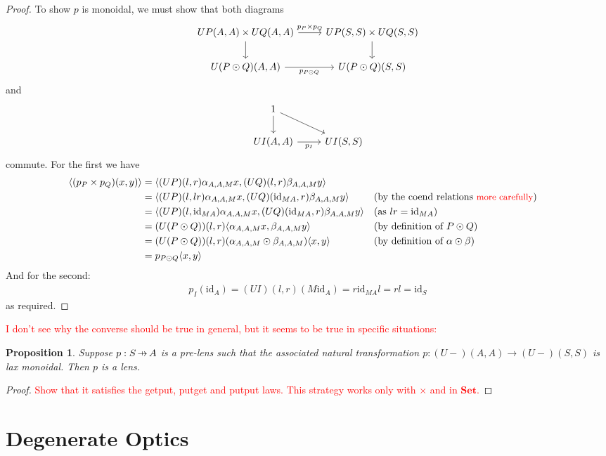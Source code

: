 \documentclass[11pt,a4paper]{article}
\theoremstyle{plain}
\newtheorem{proposition}[theorem]{Proposition}
\theoremstyle{definition}
\newcommand{\Set}{\mathbf{Set}}
\newcommand{\id}{\mathrm{id}}
\newcommand{\hto}{\ensuremath{\,\mathaccent\shortmid\rightarrow\,}}
\newcommand{\todo}[1]{\textcolor{red}{\small #1}}
\begin{document}
\begin{proof}
To show $p$ is monoidal, we must show that both diagrams
\[
\begin{tikzcd}
UP(A,A) \times UQ(A,A) \ar[r, "p_P \times p_Q"] \ar[d, swap] & UP(S, S) \times UQ(S, S)  \ar[d] \\
U(P \odot Q)(A,A)  \ar[r, "p_{P \odot Q}", swap] & U(P \odot Q)(S,S)
\end{tikzcd}
\]
and
\[
\begin{tikzcd}
1 \ar[d] \ar[dr] & \\
UI(A,A)  \ar[r, "p_I", swap] & UI(S,S)
\end{tikzcd}
\]
commute. For the first we have
\begin{align*}
\langle (p_P \times p_Q)(x, y) \rangle &= \langle (UP)(l,r) \alpha_{A,A,M} x,  (UQ)(l,r) \beta_{A,A,M} y\rangle \\
&= \langle (UP)(l,lr) \alpha_{A,A,M} x, (UQ)(\id_{MA},r) \beta_{A,A,M} y\rangle && \text{(by the coend relations \todo{more carefully})} \\
&= \langle (UP)(l,\id_{MA}) \alpha_{A,A,M} x, (UQ)(\id_{MA},r) \beta_{A,A,M} y\rangle && \text{(as $lr = \id_{MA}$)} \\
&= (U(P \odot Q))(l,r) \langle \alpha_{A,A,M} x, \beta_{A,A,M} y \rangle && \text{(by definition of $P \odot Q$)} \\
&= (U(P \odot Q))(l,r) (\alpha_{A,A,M} \odot \beta_{A,A,M}) \langle x, y \rangle && \text{(by definition of $\alpha \odot \beta$)} \\
&= p_{P \odot Q} \langle x, y \rangle
\end{align*}
And for the second:
\begin{align*}
p_I(\id_A) = (UI)(l,r) (M \id_A) = r \id_{MA} l = rl = \id_S
\end{align*}
as required.
\end{proof}

\todo{I don't see why the converse should be true in general, but it seems to be true in specific situations:}

\begin{proposition}
Suppose $p : S \hto A$ is a pre-lens such that the associated natural transformation $p : (U-)(A,A) \to (U-)(S,S)$ is lax monoidal. Then $p$ is a lens.
\end{proposition}
\begin{proof}
\todo{Show that it satisfies the getput, putget and putput laws. This strategy works only with $\times$ and in $\Set$.}
\end{proof}

\section{Degenerate Optics}
\end{document}
